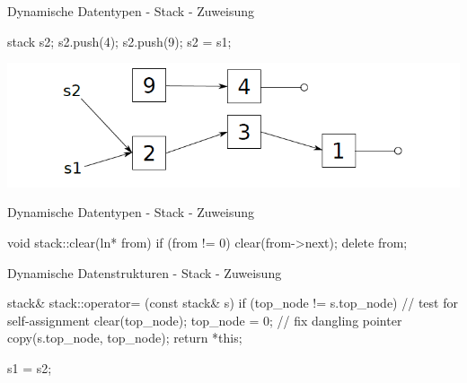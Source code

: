 \ifnum\conditionmacro=1 \documentclass[handout,usenames,dvipsnames]{beamer}\fi
\begin{document}
\begin{frame}[fragile]{Dynamische Datentypen - Stack - Zuweisung}
\begin{TPCpp}
stack s2;
s2.push(4);
s2.push(9);
s2 = s1;
\end{TPCpp}


\begin{center}
\includegraphics[width=0.9\linewidth]{Pictures/Stack2}
\end{center}
\end{frame}


\begin{frame}[fragile]{Dynamische Datentypen - Stack - Zuweisung}
\begin{TFCpp}
void stack::clear(ln* from){
	if (from != 0){
		clear(from->next);
		delete from;
	}
}
\end{TFCpp}
\end{frame}


\begin{frame}[fragile]{Dynamische Datenstrukturen - Stack - Zuweisung}
\begin{TPCpp}
stack& stack::operator= (const stack& s) {
	if (top_node != s.top_node) { // test for self-assignment
		clear(top_node);
		top_node = 0; // fix dangling pointer
		copy(s.top_node, top_node);
	}
return *this;
}
\end{TPCpp}

\begin{TPCpp}
s1 = s2;
\end{TPCpp}

\end{frame}
\end{document}
